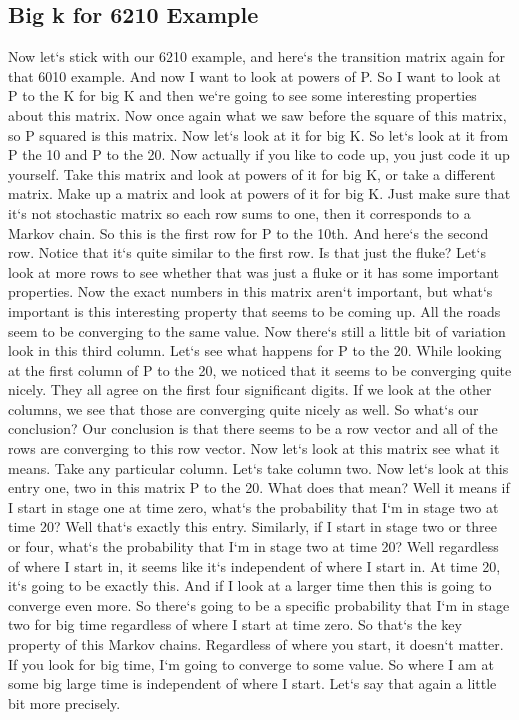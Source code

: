\subsection{Big k for 6210 Example}
Now let`s stick with our 6210 example, and here`s the transition matrix again for that 6010 example.
And now I want to look at powers of P\@.
So I want to look at P to the K for big K and then we`re going to see some interesting properties about this matrix.
Now once again what we saw before the square of this matrix, so P squared is this matrix.
Now let`s look at it for big K\@.
So let`s look at it from P the 10 and P to the 20.
Now actually if you like to code up, you just code it up yourself.
Take this matrix and look at powers of it for big K, or take a different matrix.
Make up a matrix and look at powers of it for big K\@.
Just make sure that it`s not stochastic matrix so each row sums to one, then it corresponds to a Markov chain.
So this is the first row for P to the 10th.
And here`s the second row.
Notice that it`s quite similar to the first row.
Is that just the fluke? Let`s look at more rows to see whether that was just a fluke or it has some important properties.
Now the exact numbers in this matrix aren`t important, but what`s important is this interesting property that seems to be coming up.
All the roads seem to be converging to the same value.
Now there`s still a little bit of variation look in this third column.
Let`s see what happens for P to the 20.
While looking at the first column of P to the 20, we noticed that it seems to be converging quite nicely.
They all agree on the first four significant digits.
If we look at the other columns, we see that those are converging quite nicely as well.
So what`s our conclusion? Our conclusion is that there seems to be a row vector and all of the rows are converging to this row vector.
Now let`s look at this matrix see what it means.
Take any particular column.
Let`s take column two.
Now let`s look at this entry one, two in this matrix P to the 20.
What does that mean? Well it means if I start in stage one at time zero, what`s the probability that I`m in stage two at time 20? Well that`s exactly this entry.
Similarly, if I start in stage two or three or four, what`s the probability that I`m in stage two at time 20? Well regardless of where I start in, it seems like it`s independent of where I start in.
At time 20, it`s going to be exactly this.
And if I look at a larger time then this is going to converge even more.
So there`s going to be a specific probability that I`m in stage two for big time regardless of where I start at time zero.
So that`s the key property of this Markov chains.
Regardless of where you start, it doesn`t matter.
If you look for big time, I`m going to converge to some value.
So where I am at some big large time is independent of where I start.
Let`s say that again a little bit more precisely.

